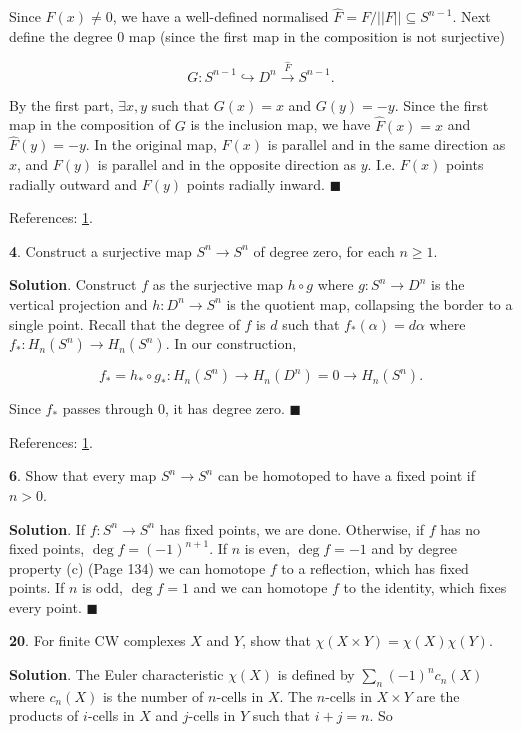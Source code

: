 \documentclass{article}
\begin{document}
Since $F(x)\neq 0$, we have a well-defined normalised $\hat{F} = F/||F||\subseteq S^{n-1}$. Next define the degree 0 map (since the first map in the composition is not surjective)

$$G: S^{n-1}\hookrightarrow D^{n}\xrightarrow{\hat{F}} S^{n-1}.$$

By the first part, $\exists x, y$ such that $G(x) = x$ and $G(y) = -y$. Since the first map in the composition of $G$ is the inclusion map, we have $\hat{F}(x) = x$ and $\hat{F}(y) = -y$. In the original map, $F(x)$ is parallel and in the same direction as $x$, and $F(y)$ is parallel and in the opposite direction as $y$. I.e. $F(x)$ points radially outward and $F(y)$ points radially inward. $\blacksquare$
\medskip

References: \href{https://pages.uoregon.edu/njp/635hw4solutions.pdf}{1}.
\bigskip
\bigskip

\textbf{4}. Construct a surjective map $S^{n}\to S^{n}$ of degree zero, for each $n\geq 1$.
\medskip

\textbf{Solution}. Construct $f$ as the surjective map $h\circ g$ where $g: S^{n}\to D^{n}$ is the vertical projection and $h: D^{n}\to S^{n}$ is the quotient map, collapsing the border to a single point. Recall that the degree of $f$ is $d$ such that $f_{\ast}(\alpha) = d\alpha$ where $f_{\ast}: H_{n}(S^{n})\to H_{n}(S^{n})$. In our construction,

$$f_{\ast} = h_{\ast}\circ g_{\ast}: H_{n}(S^{n})\to H_{n}(D^{n}) = 0\to H_{n}(S^{n}).$$

Since $f_{\ast}$ passes through 0, it has degree zero. $\blacksquare$
\medskip

References: \href{https://pages.uoregon.edu/njp/635hw4solutions.pdf}{1}.
\bigskip
\bigskip

\textbf{6}. Show that every map $S^{n}\to S^{n}$ can be homotoped to have a fixed point if $n > 0$.
\medskip

\textbf{Solution}. If $f:S^{n}\to S^{n}$ has fixed points, we are done. Otherwise, if $f$ has no fixed points, $\deg f = (-1)^{n+1}$. If $n$ is even, $\deg f = -1$ and by degree property (c) (Page 134) we can homotope $f$ to a reflection, which has fixed points. If $n$ is odd, $\deg f = 1$ and we can homotope $f$ to the identity, which fixes every point. $\blacksquare$
\bigskip
\bigskip

\textbf{20}. For finite CW complexes $X$ and $Y$, show that $\chi(X\times Y) = \chi(X)\chi(Y)$.
\medskip

\textbf{Solution}. The Euler characteristic $\chi(X)$ is defined by $\sum_{n}(-1)^{n}c_{n}(X)$ where $c_{n}(X)$ is the number of $n$-cells in $X$. The $n$-cells in $X\times Y$ are the products of $i$-cells in $X$ and $j$-cells in $Y$ such that $i+j = n$. So
\end{document}

